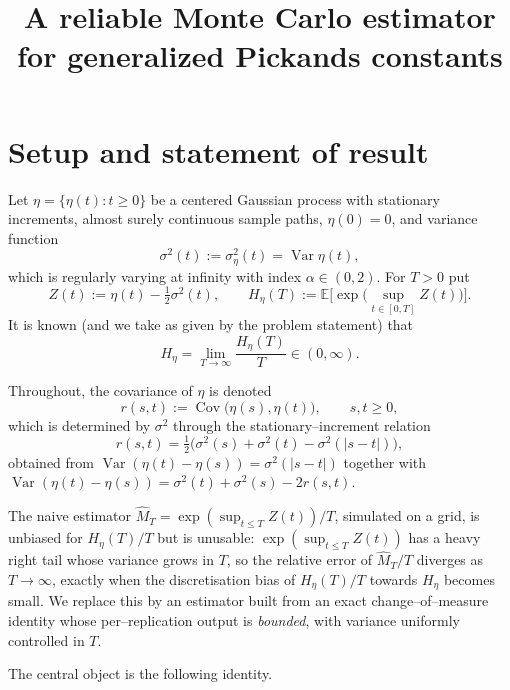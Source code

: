 \documentclass{amsart}
\theoremstyle{definition}
\DeclareMathOperator{\Var}{Var}
\DeclareMathOperator{\Cov}{Cov}
\newcommand{\E}{\mathbb{E}}
\begin{document}
\title{A reliable Monte Carlo estimator for generalized Pickands constants}
\maketitle

\section{Setup and statement of result}

Let $\eta=\{\eta(t):t\ge 0\}$ be a centered Gaussian process with stationary
increments, almost surely continuous sample paths, $\eta(0)=0$, and variance
function
\[
   \sigma^2(t):=\sigma_\eta^2(t)=\Var\eta(t),
\]
which is regularly varying at infinity with index $\alpha\in(0,2)$.  For $T>0$
put
\[
   Z(t):=\eta(t)-\tfrac12\sigma^2(t),\qquad
   H_\eta(T):=\E\!\Big[\exp\Big(\sup_{t\in[0,T]}Z(t)\Big)\Big].
\]
It is known (and we take as given by the problem statement) that
\begin{equation}\label{eq:Hdef}
   H_\eta=\lim_{T\to\infty}\frac{H_\eta(T)}{T}\in(0,\infty).
\end{equation}

\medskip\noindent
Throughout, the covariance of $\eta$ is denoted
\[
   r(s,t):=\Cov\big(\eta(s),\eta(t)\big),\qquad s,t\ge0,
\]
which is determined by $\sigma^2$ through the stationary--increment relation
\begin{equation}\label{eq:cov}
   r(s,t)=\tfrac12\big(\sigma^2(s)+\sigma^2(t)-\sigma^2(|s-t|)\big),
\end{equation}
obtained from $\Var(\eta(t)-\eta(s))=\sigma^2(|s-t|)$ together with
$\Var(\eta(t)-\eta(s))=\sigma^2(t)+\sigma^2(s)-2r(s,t)$.

\medskip
The naive estimator $\widehat M_T=\exp(\sup_{t\le T}Z(t))/T$, simulated on a grid,
is unbiased for $H_\eta(T)/T$ but is unusable: $\exp(\sup_{t\le T}Z(t))$ has a heavy
right tail whose variance grows in $T$, so the relative error of $\widehat M_T/T$
diverges as $T\to\infty$, exactly when the discretisation bias of
$H_\eta(T)/T$ towards $H_\eta$ becomes small.  We replace this by an estimator
built from an exact change--of--measure identity whose per--replication output is
\emph{bounded}, with variance uniformly controlled in $T$.

The central object is the following identity.
\end{document}
